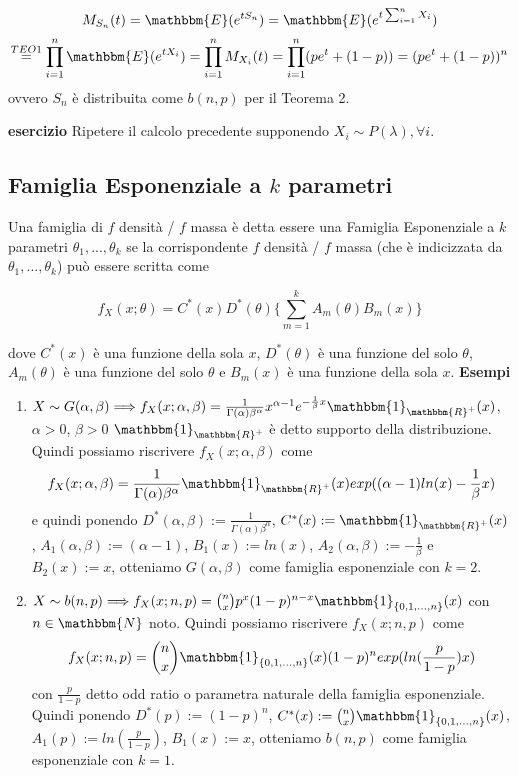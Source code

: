$$M_{S_n}(t) = \mathbbm{E}({e^{tS_n}}) = \mathbbm{E}({e^{t \sum_{i=1}^n X_i}}) $$
$$\stackrel{TEO 1}
{=} \displaystyle\prod_{i=1}^n \mathbbm{E}({e^{tX_i}}) = \displaystyle\prod_{i=1}^n M_{X_i}(t) = \displaystyle\prod_{i=1}^n (p e^t + (1-p)) = (p e^t + (1-p))^n$$ ovvero $S_n$ è distribuita come $b(n,p)$ per il Teorema 2.

\textbf{esercizio}
Ripetere il calcolo precedente supponendo $X_i \sim P(\lambda), \forall i$.

\subsection{Famiglia Esponenziale a $k$ parametri}
Una famiglia di $f$ densità / $f$ massa è detta essere una Famiglia Esponenziale a $k$ parametri $\theta_1,...,\theta_k$ se la corrispondente $f$ densità / $f$ massa (che è indicizzata da $\theta_1,...,\theta_k$) può essere scritta come

$$f_X(x;\theta) = C^*(x) D^*(\theta) \lbrace \displaystyle\sum_{m=1}^k A_m(\theta) B_m (x) \rbrace$$

dove $C^*(x)$ è una funzione della sola $x$, $D^*(\theta)$ è una funzione del solo $\theta$, $A_m(\theta)$ è una funzione del solo $\theta$ e $B_m(x)$ è una funzione della sola $x$.
\textbf{Esempi}
\begin{enumerate}
\item 
$X \sim G(\alpha, \beta) \Longrightarrow f_X(x; \alpha, \beta) = \frac{1}{\Gamma(\alpha) \beta^\alpha} x^{\alpha -1} e^{- \frac{1}{\beta} x} \mathbbm{1}_{\mathbbm{R}^+}(x)$, $\alpha >0$, $\beta >0$
$\mathbbm{1}_{\mathbbm{R}^+}$ è detto supporto della distribuzione.
Quindi possiamo riscrivere $f_X(x; \alpha, \beta)$ come
$$f_X(x; \alpha, \beta) = \frac{1}{\Gamma(\alpha) \beta^\alpha} \mathbbm{1}_{\mathbbm{R}^+}(x) exp((\alpha -1) ln(x) - \frac{1}{\beta} x)$$
e quindi ponendo $D^*(\alpha, \beta) := \frac{1}{\Gamma(\alpha) \beta^\alpha}$, $C^*(x) := \mathbbm{1}_{\mathbbm{R}^+}(x)$, $A_1(\alpha, \beta) := (\alpha -1)$, $B_1(x) := ln(x)$, $A_2(\alpha, \beta) := - \frac{1}{\beta}$ e $B_2(x) := x$, otteniamo $G(\alpha, \beta)$ come famiglia esponenziale con $k=2$.

\item $X \sim b(n,p) \Longrightarrow f_X(x; n,p) = \binom{n}{x} p^x (1-p)^{n-x} \mathbbm{1}_{\lbrace 0,1,...,n \rbrace}(x)$ con $n \in \mathbbm{N}$ noto.
Quindi possiamo riscrivere $f_X(x; n,p)$ come
$$f_X(x; n,p) = \binom{n}{x} \mathbbm{1}_{\lbrace 0,1,...,n \rbrace}(x) (1-p)^n exp(ln(\frac{p}{1-p}) x)$$ con $\frac{p}{1-p}$ detto odd ratio o parametra naturale della famiglia esponenziale.\\
Quindi ponendo $D^*(p) := (1-p)^n$, $C^*(x) := \binom{n}{x} \mathbbm{1}_{\lbrace 0,1,...,n \rbrace}(x)$, $A_1(p) := ln(\frac{p}{1-p})$, $B_1(x) := x$, otteniamo $b(n,p)$ come famiglia esponenziale con $k=1$.
\end{enumerate}

